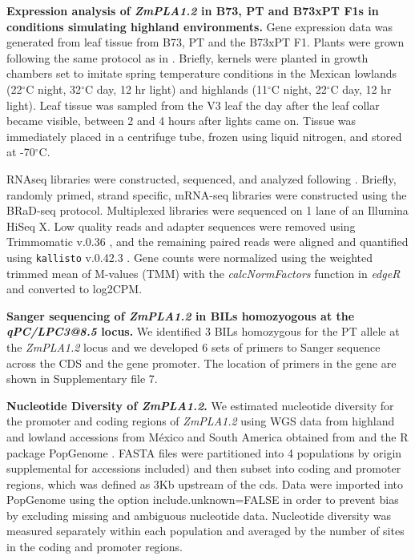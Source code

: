 \documentclass[9pt,twocolumn,twoside,lineno]{BioRxiv}
\begin{document}
\textbf{Expression analysis of \textit{ZmPLA1.2} in B73, PT and B73xPT F1s in conditions simulating highland environments.}
Gene expression data was generated from leaf tissue from B73, PT and the B73xPT F1. 
Plants were grown following the same protocol as in \cite{Crow2020-gene}.
Briefly, kernels were planted in growth chambers set to imitate spring temperature conditions in the Mexican lowlands (22$^{\circ}$C night, 32$^{\circ}$C day, 12 hr light) and highlands (11$^{\circ}$C night, 22$^{\circ}$C day, 12 hr light). 
Leaf tissue was sampled from the V3 leaf the day after the leaf collar became visible, between 2 and 4 hours after lights came on. Tissue was immediately placed in a centrifuge tube, frozen using liquid nitrogen, and stored at -70$^{\circ}$C.

RNAseq libraries were constructed, sequenced, and analyzed following \cite{Crow2020-gene}. 
Briefly, randomly primed, strand specific, mRNA-seq libraries were constructed using the BRaD-seq \cite{townsley2015brad} protocol.
Multiplexed libraries were sequenced on 1 lane of an Illumina HiSeq X. 
Low quality reads and adapter sequences were removed using Trimmomatic v.0.36 \cite{bolger2014trimmomatic}, and the remaining paired reads were aligned and quantified using \texttt{kallisto} v.0.42.3 \cite{bray2016near}. 
Gene counts were normalized using the weighted trimmed mean of M-values (TMM) with the \textit{calcNormFactors} function in \textit{edgeR} \cite{robinson2010edger} and converted to log2CPM.

\textbf{Sanger sequencing of \textit{ZmPLA1.2} in BILs homozyogous at the \textit{qPC/LPC3@8.5} locus.}
We identified 3 BILs homozygous for the PT allele at the \textit{ZmPLA1.2} locus and we developed 6 sets of primers to Sanger sequence across the CDS and the gene promoter. 
The location of primers in the gene are shown in Supplementary file 7. 

\textbf{Nucleotide Diversity of \textit{ZmPLA1.2}.}
We estimated nucleotide diversity for the promoter and coding regions of \textit{ZmPLA1.2} using WGS data from highland and lowland accessions from M\'exico and South America obtained from \cite{Wang2017-bc} and the R package PopGenome \cite{Pfeifer2014-bg}. %
FASTA files were partitioned into 4 populations by origin supplemental for accessions included) and then subset into coding and promoter regions, which was defined as 3Kb upstream of the cds.  %
Data were imported into PopGenome using the option include.unknown=FALSE in order to prevent bias by excluding missing and ambiguous nucleotide data.
Nucleotide diversity was measured separately within each population and averaged by the number of sites in the coding and promoter regions.
\end{document}
